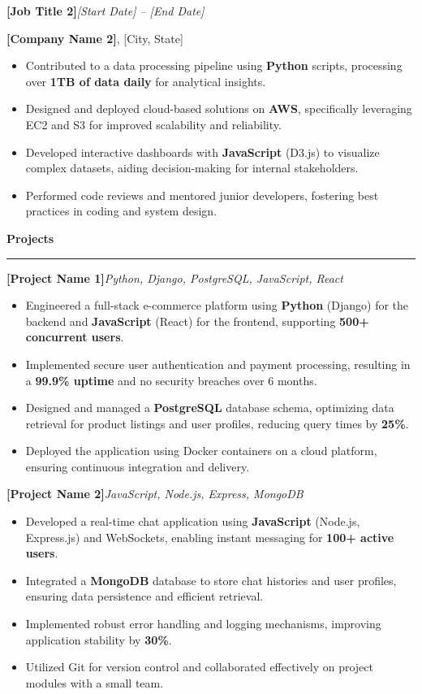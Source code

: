 \documentclass{article}
\newcommand{\resheading}[1]{%
  \vspace{6pt}\noindent\textbf{\Large #1}%
  \par\vspace{3pt}\hrule\vspace{3pt}%
}
\newcommand{\ressubheading}[2]{%
  \vspace{4pt}\noindent\textbf{#1}\hfill\textit{#2}%
  \par\vspace{2pt}%
}
\begin{document}
\ressubheading{[Job Title 2]}{[Start Date] -- [End Date]}
\noindent \textbf{[Company Name 2]}, [City, State]
\begin{itemize}[nosep]
    \item Contributed to a data processing pipeline using \textbf{Python} scripts, processing over \textbf{1TB of data daily} for analytical insights.
    \item Designed and deployed cloud-based solutions on \textbf{AWS}, specifically leveraging EC2 and S3 for improved scalability and reliability.
    \item Developed interactive dashboards with \textbf{JavaScript} (D3.js) to visualize complex datasets, aiding decision-making for internal stakeholders.
    \item Performed code reviews and mentored junior developers, fostering best practices in coding and system design.
\end{itemize}

\resheading{Projects}

\ressubheading{[Project Name 1]}{Python, Django, PostgreSQL, JavaScript, React}
\begin{itemize}[nosep]
    \item Engineered a full-stack e-commerce platform using \textbf{Python} (Django) for the backend and \textbf{JavaScript} (React) for the frontend, supporting \textbf{500+ concurrent users}.
    \item Implemented secure user authentication and payment processing, resulting in a \textbf{99.9\% uptime} and no security breaches over 6 months.
    \item Designed and managed a \textbf{PostgreSQL} database schema, optimizing data retrieval for product listings and user profiles, reducing query times by \textbf{25\%}.
    \item Deployed the application using Docker containers on a cloud platform, ensuring continuous integration and delivery.
\end{itemize}

\ressubheading{[Project Name 2]}{JavaScript, Node.js, Express, MongoDB}
\begin{itemize}[nosep]
    \item Developed a real-time chat application using \textbf{JavaScript} (Node.js, Express.js) and WebSockets, enabling instant messaging for \textbf{100+ active users}.
    \item Integrated a \textbf{MongoDB} database to store chat histories and user profiles, ensuring data persistence and efficient retrieval.
    \item Implemented robust error handling and logging mechanisms, improving application stability by \textbf{30\%}.
    \item Utilized Git for version control and collaborated effectively on project modules with a small team.
\end{itemize}
\end{document}
